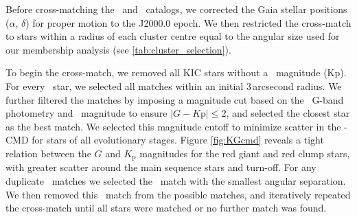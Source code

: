 Before cross-matching the \Gaia~and \Kepler~catalogs, we corrected the Gaia stellar positions ($\alpha$, $\delta$) for proper motion to the J2000.0 epoch. We then restricted the cross-match to stars within a radius of each cluster centre equal to the angular size used for our membership analysis (see \cref{tab:cluster_selection}).

To begin the cross-match, we removed all KIC stars without a \Kepler~magnitude (Kp). For every \Gaia~star, we selected all matches within an initial 3\,arcsecond radius. We further filtered the matches by imposing a magnitude cut based on the \Gaia~G-band photometry and \Kepler~magnitude to ensure ${|G-K\mathrm{p}| \leq 2}$, and selected the closest star as the best match. We selected this magnitude cutoff to minimize scatter in the \Kepler-\Gaia CMD for stars of all evolutionary stages. Figure \ref{fig:KGcmd} reveals a tight relation between the $G$ and $K_\mathrm{p}$ magnitudes for the red giant and red clump stars, with greater scatter around the main sequence stars and turn-off. For any duplicate \Kepler~matches we selected the \Gaia~match with the smallest angular separation. We then removed this \Kepler~match from the possible matches, and iteratively repeated the cross-match until all stars were matched or no further match was found. 

